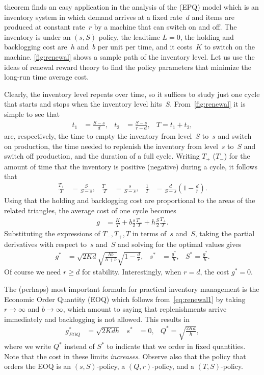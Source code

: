 \documentclass[queueing-book.tex]{subfiles}
\begin{document}
 theorem finds an easy application in the analysis of the  (EPQ) model which is an inventory system in which demand arrives at a fixed rate~$d$ and items are produced at constant rate~$r$ by a machine that can switch on and off.
The inventory is under an $(s,S)$ policy, the leadtime $L=0$, the holding and backlogging cost are~$h$ and~$b$ per unit per time, and it costs~$K$ to switch on the machine.
\cref{fig:renewal} shows a sample path of the inventory level.
Let us use the ideas of renewal reward theory to find the policy parameters that minimize the long-run time average cost.


Clearly, the inventory level repeats over time, so it suffices to study just one cycle that starts and stops when the inventory level hits~$S$.
From~\cref{fig:renewal} it is simple to see that
  \begin{align*}
    t_1 &= \frac{S-s}{d}, & t_2 &= \frac{S-s}{r-d}, & T = t_1+t_{2},
  \end{align*}
  are, respectively, the time to empty the inventory from level~$S$ to~$s$ and switch on production, the time needed to replenish the inventory from level~$s$ to~$S$ and switch off production, and the duration of a full cycle.
Writing $T_+$ ($T_-$) for the amount of time that the inventory is positive (negative) during a cycle, it follows that
\begin{align*}
\frac{T_+}T &= \frac{S}{S-s},
& \frac{T_-}T &= \frac{s}{S-s},
&  \frac 1 T &= \frac{d}{S-s} \left(1-\frac d r\right).
\end{align*}
Using that the holding and backlogging cost are proportional to the areas of the related triangles,  the average cost of one cycle becomes
\begin{align*}
g
&=\frac{K}{T} +  b\frac{s}{2} \frac{T_-} T  + h\frac{S}{2} \frac{T_+}{T}.
\end{align*}
Substituting the expressions of $T_{-}, T_{+}, T$ in terms of~$s$ and~$S$, taking the partial derivatives with respect to~$s$ and~$S$ and solving for the optimal values gives
\begin{align}\label{eq:renewal1}
g^{*} &= \sqrt{2Kd} \sqrt{\frac{hb}{h+b}}\sqrt{1-\frac d r}, & s^{*} &= \frac{g^{*}}b, & S^{*} = \frac{g^{*}}{h}.
\end{align}
Of course we need  $r\geq d$ for stability. Interestingly, when $r=d$, the cost $g^{*} = 0$.

The (perhaps) most important formula for practical inventory management is the Economic Order Quantity (EOQ) which follows from~\cref{eq:renewal1} by taking $r\to \infty$ and $b\to\infty$, which amount to saying that replenishments arrive immediately and backlogging is not allowed.
This results in
\begin{align*}
g^{*}_{EOQ} &= \sqrt{2Kdh} & s^{*} &= 0, & Q^{*} = \sqrt{\frac{2Kd}{h}},
\end{align*}
where we write $Q^{*}$  instead of $S^{*}$ to indicate that we order in fixed quantities.
Note that the cost in these limits \emph{increases}.
Observe also that the policy that orders the EOQ is an $(s,S)$-policy, a $(Q,r)$-policy, and a $(T,S)$-policy.
\end{document}
